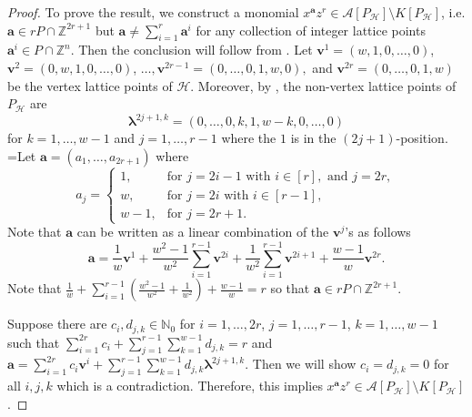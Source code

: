 \documentclass [12pt,a4paper,reqno]{amsart}
\theoremstyle{plain}
\theoremstyle{definition}
\newtheorem{Assumptions and Discussion}[Theorem]{Assumptions and Discussion}
\theoremstyle{remark}
\newcommand\bfa{\mathbf{a}}
\newcommand\bfv{\mathbf{v}}
\newcommand\bflam{\boldsymbol{\lambda}}
\newcommand\calA{\mathcal{A}}
\newcommand\calH{\mathcal{H}}
\begin{document}
\begin{proof}
 To prove the result, we construct a monomial $x^\bfa z^r \in \calA[P_\calH] \setminus K[P_\calH]$, i.e. $\bfa\in rP\cap \mathbb{Z}^{2r+1}$ but $\bfa\neq \sum_{i=1}^r\bfa^i$ for any collection of integer lattice points $\bfa^i\in P\cap\mathbb{Z}^n$. Then the conclusion will follow from . Let $\bfv^1=(w,1,0,\ldots,0)$, $\bfv^2=(0,w,1,0,\ldots,0)$, $\dots, \bfv^{2r-1}=(0,\ldots,0,1,w,0),$ and $\bfv^{2r}=(0,\ldots,0,1,w)$ be the vertex lattice points of $\calH$. Moreover, by , the non-vertex lattice points of $P_\calH$ are $$\bflam^{2j+1,k}=(0,\ldots,0,k,1,w-k,0,\ldots,0)$$ for $k=1,\ldots, w-1$ and $j=1,\ldots, r-1$ where the $1$ is in the $(2j+1)$-position. =Let $\bfa=(a_1,\ldots, a_{2r+1})$ where
 \[
    a_j = \begin{cases}
        1, & \text{for }j=2i-1\text{ with }i\in[r],\text{ and }j=2r,\\
        w, & \text{for }j=2i\text{ with }i\in[r-1],\\
        w-1, & \text{for }j=2r+1.
        \end{cases}
\]
 Note that $\bfa$ can be written as a linear combination of the $\bfv^j$'s as follows
    \[
        \bfa =\frac{1}{w}\bfv^1+\frac{w^2-1}{w^2}\sum_{i=1}^{r-1}\bfv^{2i}+\frac{1}{w^2}\sum_{i=1}^{r-1}\bfv^{2i+1}+\frac{w-1}{w}\bfv^{2r}. 
    \]
   Note that $\frac{1}{w}+\sum_{i=1}^{r-1}(\frac{w^2-1}{w^2}+\frac{1}{w^2})+\frac{w-1}{w}=r$ so that $\bfa\in rP\cap\mathbb{Z}^{2r+1}$. 

   Suppose there are $c_i, d_{j,k} \in \mathbb{N}_0$ for $i=1,\ldots,2r$, $j=1,\ldots, r-1$, $k=1,\ldots,w-1$ such that $\sum_{i=1}^{2r}c_i+\sum_{j=1}^{r-1}\sum_{k=1}^{w-1}d_{j,k}=r$ and $\bfa = \sum_{i=1}^{2r}c_{i}\bfv^i+\sum_{j=1}^{r-1}\sum_{k=1}^{w-1}d_{j,k}\bflam^{2j+1,k}$.  Then we will show $c_i=d_{j,k}=0$ for all $i,j,k$ which is a contradiction. Therefore, this implies $x^\bfa z^r \in \calA[P_\calH] \setminus K[P_\calH]$. 
   

\end{proof}
\end{document}
